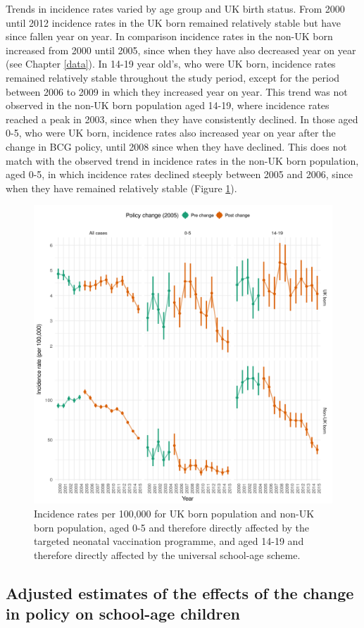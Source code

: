 \documentclass[11pt,twoside]{bristolthesis}
\begin{document}
  Trends in incidence rates varied by age group and UK birth status. From 2000 until 2012 incidence rates in the UK born remained relatively stable but have since fallen year on year. In comparison incidence rates in the non-UK born increased from 2000 until 2005, since when they have also decreased year on year (see Chapter \ref{data}). In 14-19 year old's, who were UK born, incidence rates remained relatively stable throughout the study period, except for the period between 2006 to 2009 in which they increased year on year. This trend was not observed in the non-UK born population aged 14-19, where incidence rates reached a peak in 2003, since when they have consistently declined. In those aged 0-5, who were UK born, incidence rates also increased year on year after the change in BCG policy, until 2008 since when they have declined. This does not match with the observed trend in incidence rates in the non-UK born population, aged 0-5, in which incidence rates declined steeply between 2005 and 2006, since when they have remained relatively stable (Figure \ref{fig:07-inc-rate-summary-plot}).
  \begin{figure}
  
  {\centering \includegraphics[width=0.8\linewidth]{chapters/direct-eff-bcg-change/figure-2} 
  
  }
  
  \caption{Incidence rates per 100,000 for UK born population and non-UK born population, aged 0-5 and therefore directly affected by the targeted neonatal vaccination programme, and aged 14-19 and therefore directly affected by the universal school-age scheme.}\label{fig:07-inc-rate-summary-plot}
  \end{figure}
  \hypertarget{adjusted-estimates-of-the-effects-of-the-change-in-policy-on-school-age-children}{%
  \subsection{Adjusted estimates of the effects of the change in policy on school-age children}\label{adjusted-estimates-of-the-effects-of-the-change-in-policy-on-school-age-children}}
  
\end{document}
